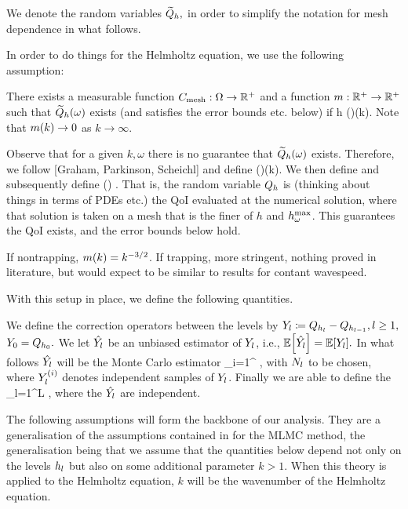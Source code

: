 We denote the random variables $\widetilde{Q}_{h},$ in order to simplify the notation for mesh dependence in what follows.

In order to do things for the Helmholtz equation, we use the following assumption:

There exists a measurable function $C_{\mathrm{mesh}}:\Omega\rightarrow \mathbb R^{+}$ and a function $m:\mathbb R^{+}\rightarrow \mathbb R^{+}$ such that $\widetilde{Q}_{h}(\omega)$ exists (and satisfies the error bounds etc. below) if
\beqs
h \leq \Cmesh(\omega)\mesh(k).
\eeqs
Note that $m(k)\rightarrow 0$ as $k\rightarrow \infty.$
\eas

Observe that for a given $k, \omega$ there is no guarantee that $\widetilde{Q}_{h}(\omega)$ exists. Therefore, we follow [Graham, Parkinson, Scheichl] and define
\beq\label{eq:hmaxomega}
\hmaxomega \de \Cmesh(\omega)\mesh(k).
\eeq
We then define
\beqs
\homega \de \max{}
\eeqs
and subsequently define
\beqs
\Qh(\omega) \de \Qtildehomega.
\eeqs
That is, the random variable $Q_{h}$ is (thinking about things in terms of PDEs etc.) the QoI evaluated at the numerical solution, where that solution is taken on a mesh that is the finer of $h$ and $h^{\max}_{\omega}$. This guarantees the QoI exists, and the error bounds below hold.

If nontrapping, $m(k)=k^{-3/2}$. If trapping, more stringent, nothing proved in literature, but would expect to be similar to results for contant wavespeed.
\ere

With this setup in place, we define the following quantities.

We define the correction operators between the levels by $Y_{l} \coloneqq Q_{h_{l}} - Q_{h_{l-1}}, l \geq 1,$ $Y_{0} = Q_{h_{0}}.$ We let $\hat{Y_{l}}$ be an unbiased estimator of $Y_{l}$, i.e., $\EXP{\Ylhat} = \EXP{\Yl}.$ In what follows $\hat{Y_{l}}$ will be the Monte Carlo estimator
 \beqs
\Ylhat \de {}\sum_{i=1}^{\Nl} \Yli,
 \eeqs
 with $N_{l}$ to be chosen, where $Y_{l}^{(i)}$ denotes independent samples of $Y_{l}$. Finally we are able to define the 
 \beqs
 \QhatMLhL \de \sum_{l=1}^L \Ylhat,
 \eeqs
 where the $\hat{Y_{l}}$ are independent.

  The following assumptions
   will form the backbone of our analysis. They are a generalisation of the assumptions contained in \cite{ClGiScTe:11,ChScTe:13} for the MLMC method, the generalisation being that we assume that the quantities below depend not only on the levels $h_{l}$ but also on some additional parameter $k>1.$ When this theory is applied to the Helmholtz equation, $k$ will be the wavenumber of the Helmholtz equation.

